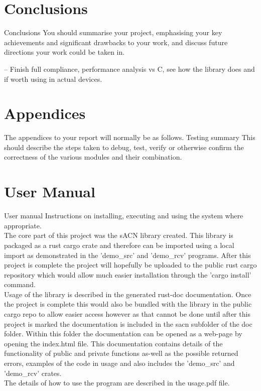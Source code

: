 \documentclass[11pt,a4paper]{article}
\begin{document}
\section{Conclusions}
Conclusions
You should summarise your project, emphasising your
key achievements and significant drawbacks to your
work, and discuss future directions your work could be
taken in.

-- Finish full compliance, performance analysis vs C, see how the library does and if worth using in actual devices. 

\section{Appendices}
The appendices to your report will normally be as follows.
Testing
summary
This should describe the steps taken to debug, test,
verify or otherwise confirm the correctness of the
various modules and their combination.

\section{User Manual}
User manual Instructions on installing, executing and using the
system where appropriate.\\

The core part of this project was the sACN library created. This library is packaged as a rust cargo crate and therefore can be imported using a local import as demonstrated in the 'demo\_src' and 'demo\_rcv' programs. After this project is complete the project will hopefully be uploaded to the public rust cargo repository which would allow much easier installation through the 'cargo install' command.\\

Usage of the library is described in the generated rust-doc documentation. Once the project is complete this would also be bundled with the library in the public cargo repo to allow easier access however as that cannot be done until after this project is marked the documentation is included in the sacn subfolder of the doc folder. Within this folder the documentation can be opened as a web-page by opening the index.html file. This documentation contains details of the functionality of public and private functions as-well as the possible returned errors, examples of the code in usage and also includes the 'demo\_src' and 'demo\_rcv' crates.\\

The details of how to use the program are described in the usage.pdf file.
\end{document}
